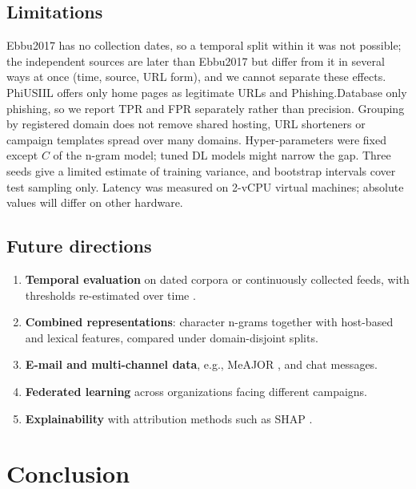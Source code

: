 \documentclass[conference]{IEEEtran}
\begin{document}
\subsection{Limitations}

Ebbu2017 has no collection dates, so a temporal split within it was not possible; the independent sources are later than Ebbu2017 but differ from it in several ways at once (time, source, URL form), and we cannot separate these effects. PhiUSIIL offers only home pages as legitimate URLs and Phishing.Database only phishing, so we report TPR and FPR separately rather than precision. Grouping by registered domain does not remove shared hosting, URL shorteners or campaign templates spread over many domains. Hyper-parameters were fixed except $C$ of the n-gram model; tuned DL models might narrow the gap. Three seeds give a limited estimate of training variance, and bootstrap intervals cover test sampling only. Latency was measured on 2-vCPU virtual machines; absolute values will differ on other hardware.

\subsection{Future directions}

\begin{enumerate}
\item \textbf{Temporal evaluation} on dated corpora or continuously collected feeds, with thresholds re-estimated over time \cite{glazyrina2026}.
\item \textbf{Combined representations}: character n-grams together with host-based and lexical features, compared under domain-disjoint splits.
\item \textbf{E-mail and multi-channel data}, e.g., MeAJOR \cite{mendes2025}, and chat messages.
\item \textbf{Federated learning} \cite{mcmahan2017} across organizations facing different campaigns.
\item \textbf{Explainability} with attribution methods such as SHAP \cite{lundberg2017}.
\end{enumerate}

\section{Conclusion}\label{sec:conclusion}
\end{document}
